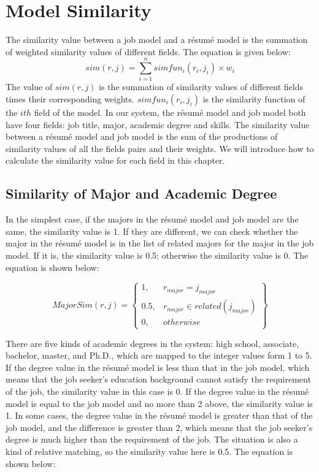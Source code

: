 

\section{Model Similarity}
\label{sec1}

The similarity value between a  job model and a r\'esum\'e model is the summation of weighted similarity values of different fields. The equation is given below:
$$ sim(r, j) = \sum_{i=1}^{n} simfun_i(r_i,j_i) \times w_i $$
The value of $sim(r, j)$ is the summation of similarity values of different fields times their corresponding weights. $simfun_i(r_i,j_i)$ is the similarity function of the $ith$ field of the model. In our system, the r\'esum\'e model and job model both have four fields: job title, major, academic degree and skills. The similarity value between a r\'esum\'e model and job model is the sum of the productions of similarity values of all the fields pairs and their weights. We will introduce how to calculate the similarity value for each field in this chapter.

\subsection{Similarity of Major and Academic Degree}

In the simplest case, if the majors in the r\'esum\'e model and job model are the same, the similarity value is 1. If they are different, we can check whether the major in the r\'esum\'e model is in the list of related majors for the major in the job model. If it is, the similarity value is 0.5; otherwise the similarity value is 0. The equation is shown below:

$$ MajorSim(r,j ) = \begin{Bmatrix}
1, & r_{major} = j_{major} \\
0.5, & r_{major} \in related( j_{major} ) \\
0, & otherwise
\end{Bmatrix} $$

There are five kinds of academic degrees in the system:  high school, associate, bachelor, master, and Ph.D., which are mapped to the integer values form 1 to 5. If the degree value in the r\'esum\'e model is less than that in the job model, which means that the job seeker's education background cannot satisfy the requirement of the job, the similarity value in this case is 0. If the degree value in the r\'esum\'e model is equal to the job model and no more than 2 above, the similarity value is 1. In some cases, the degree value in the r\'esum\'e model is greater than that of the job model, and the difference is greater than 2, which means that the job seeker's degree is much higher than the requirement of the job. The situation is also a kind of relative matching, so the similarity value here is 0.5. The equation is shown below:

